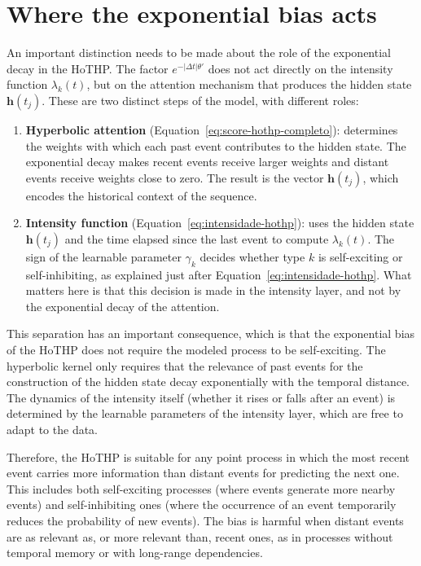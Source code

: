 \section{Where the exponential bias acts}
\label{sec:onde-atua-vies}

An important distinction needs to be made about the role of the exponential decay in the HoTHP. The factor $e^{-|\Delta t|\theta'}$ does not act directly on the intensity function $\lambda_k(t)$, but on the attention mechanism that produces the hidden state $\mathbf{h}(t_j)$. These are two distinct steps of the model, with different roles:

\begin{enumerate}
    \item \textbf{Hyperbolic attention} (Equation~\eqref{eq:score-hothp-completo}): determines the weights with which each past event contributes to the hidden state. The exponential decay makes recent events receive larger weights and distant events receive weights close to zero. The result is the vector $\mathbf{h}(t_j)$, which encodes the historical context of the sequence.

    \item \textbf{Intensity function} (Equation~\eqref{eq:intensidade-hothp}): uses the hidden state $\mathbf{h}(t_j)$ and the time elapsed since the last event to compute $\lambda_k(t)$. The sign of the learnable parameter $\gamma_k$ decides whether type $k$ is self-exciting or self-inhibiting, as explained just after Equation~\eqref{eq:intensidade-hothp}. What matters here is that this decision is made in the intensity layer, and not by the exponential decay of the attention.
\end{enumerate}

This separation has an important consequence, which is that the exponential bias of the HoTHP does not require the modeled process to be self-exciting. The hyperbolic kernel only requires that the relevance of past events for the construction of the hidden state decay exponentially with the temporal distance. The dynamics of the intensity itself (whether it rises or falls after an event) is determined by the learnable parameters of the intensity layer, which are free to adapt to the data.

Therefore, the HoTHP is suitable for any point process in which the most recent event carries more information than distant events for predicting the next one. This includes both self-exciting processes (where events generate more nearby events) and self-inhibiting ones (where the occurrence of an event temporarily reduces the probability of new events). The bias is harmful when distant events are as relevant as, or more relevant than, recent ones, as in processes without temporal memory or with long-range dependencies.

